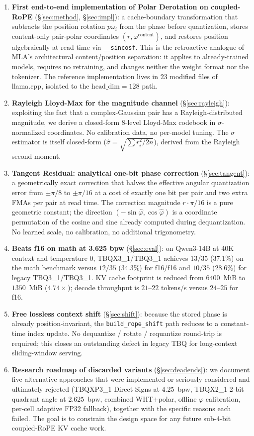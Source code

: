 \documentclass[10pt,twocolumn]{article}
\begin{document}
\begin{enumerate}[leftmargin=*,topsep=2pt,itemsep=1pt]
\item \textbf{First end-to-end implementation of Polar Derotation on coupled-RoPE} (\S\ref{sec:method}, \S\ref{sec:impl}): a cache-boundary transformation that subtracts the position rotation $p\omega_i$ from the phase before quantization, stores content-only pair-polar coordinates $(r,\varphi^{\text{content}})$, and restores position algebraically at read time via \texttt{\_\_sincosf}. This is the retroactive analogue of MLA's architectural content/position separation: it applies to already-trained models, requires no retraining, and changes neither the weight format nor the tokenizer. The reference implementation lives in 23 modified files of llama.cpp, isolated to the $\text{head\_dim}=128$ path.
\item \textbf{Rayleigh Lloyd-Max for the magnitude channel} (\S\ref{sec:rayleigh}): exploiting the fact that a complex-Gaussian pair has a Rayleigh-distributed magnitude, we derive a closed-form 8-level Lloyd-Max codebook in $\sigma$-normalized coordinates. No calibration data, no per-model tuning. The $\sigma$ estimator is itself closed-form ($\hat\sigma = \sqrt{\sum r_i^2 / 2n}$), derived from the Rayleigh second moment.
\item \textbf{Tangent Residual: analytical one-bit phase correction} (\S\ref{sec:tangent}): a geometrically exact correction that halves the effective angular quantization error from $\pm\pi/8$ to $\pm\pi/16$ at a cost of exactly one bit per pair and two extra FMAs per pair at read time. The correction magnitude $r\cdot\pi/16$ is a pure geometric constant; the direction $(-\sin\hat\varphi,\cos\hat\varphi)$ is a coordinate permutation of the cosine and sine already computed during dequantization. No learned scale, no calibration, no additional trigonometry.
\item \textbf{Beats f16 on math at 3.625 bpw} (\S\ref{sec:eval}): on Qwen3-14B at 40K context and temperature $0$, TBQX3\_1/TBQ3\_1 achieves $13/35$ ($37.1\%$) on the math benchmark versus $12/35$ ($34.3\%$) for f16/f16 and $10/35$ ($28.6\%$) for legacy TBQ3\_1/TBQ3\_1. KV cache footprint is reduced from $6400$~MiB to $1350$~MiB ($4.74\times$); decode throughput is $21$--$22$ tokens/s versus $24$--$25$ for f16.
\item \textbf{Free lossless context shift} (\S\ref{sec:shift}): because the stored phase is already position-invariant, the \texttt{build\_rope\_shift} path reduces to a constant-time index update. No dequantize / rotate / requantize round-trip is required; this closes an outstanding defect in legacy TBQ for long-context sliding-window serving.
\item \textbf{Research roadmap of discarded variants} (\S\ref{sec:deadends}): we document five alternative approaches that were implemented or seriously considered and ultimately rejected (TBQXP3\_1 Direct Signs at $4.25$~bpw, TBQX2\_1 2-bit quadrant angle at $2.625$~bpw, combined WHT$+$polar, offline $\varphi$ calibration, per-cell adaptive FP32 fallback), together with the specific reasons each failed. The goal is to constrain the design space for any future sub-4-bit coupled-RoPE KV cache work.
\end{enumerate}
\end{document}

